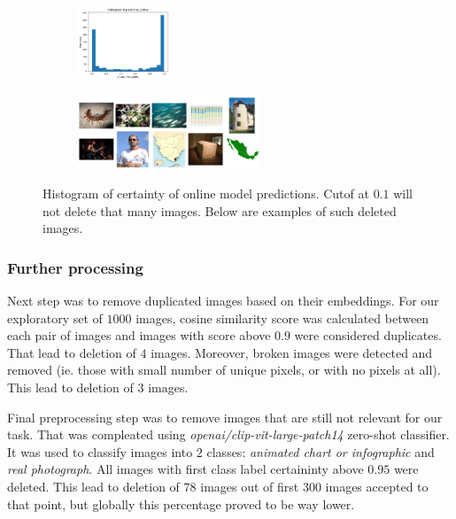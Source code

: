 \documentclass[a4paper]{article}
\begin{document}
\begin{figure}[H]
    \centering
    \begin{subfigure}[b]{\textwidth}
        \centering
        \includegraphics[width=0.3\textwidth]{images/histogram.png}
    \end{subfigure}

    \vspace{0.5cm}

    \begin{subfigure}[b]{\textwidth}
        \centering
        \includegraphics[width=0.6\textwidth]{images/deleted.png}
    \end{subfigure}
    \caption{Histogram of certainty of online model predictions. Cutof at $0.1$ will not delete that many images. Below are examples of such deleted images.}
    \label{fig:mllms_results}
\end{figure}

\subsubsection{Further processing}

Next step was to remove duplicated images based on their embeddings. For our exploratory set of $1000$ images, cosine similarity score was calculated between each pair of images and images with score above $0.9$ were considered duplicates. That lead to deletion of $4$ images. Moreover, broken images were detected and removed (ie. those with small number of unique pixels, or with no pixels at all). This lead to deletion of $3$ images.

Final preprocessing step was to remove images that are still not relevant for our task. That was compleated using \textit{openai/clip-vit-large-patch14} zero-shot classifier. It was used to classify images into $2$ classes: \textit{animated chart or infographic} and \textit{real photograph}. All images with first class label certaininty above $0.95$ were deleted. This lead to deletion of $ 78$ images out of first $300$ images accepted to that point, but globally this percentage proved to be way lower.
\end{document}
